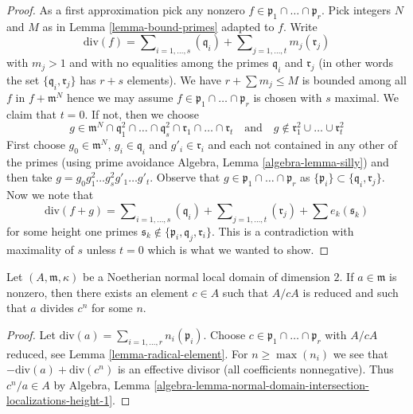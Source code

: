 \begin{proof}
As a first approximation pick any nonzero
$f \in \mathfrak p_1 \cap \ldots \cap \mathfrak p_r$.
Pick integers $N$ and $M$ as in Lemma \ref{lemma-bound-primes}
adapted to $f$. Write
$$
\text{div}(f) =
\sum\nolimits_{i = 1, \ldots, s} (\mathfrak q_i) +
\sum\nolimits_{j = 1, \ldots, t} m_j (\mathfrak r_j)
$$
with $m_j > 1$ and with no equalities among the primes
$\mathfrak q_i$ and $\mathfrak r_j$ (in other words the set
$\{\mathfrak q_i, \mathfrak r_j\}$ has $r + s$ elements).
We have $r + \sum m_j \leq M$ is bounded among all $f$ in
$f + \mathfrak m^N$ hence we may assume
$f \in \mathfrak p_1 \cap \ldots \cap \mathfrak p_r$ is chosen with $s$
maximal. We claim that $t = 0$. If not, then we choose
$$
g \in
\mathfrak m^N \cap
\mathfrak q_1^2 \cap \ldots \cap \mathfrak q_s^2 \cap
\mathfrak r_1 \cap \ldots \cap \mathfrak r_t
\quad\text{and}\quad
g \not \in \mathfrak r_1^2 \cup \ldots \cup \mathfrak r_t^2
$$
First choose $g_0 \in \mathfrak m^N$,
$g_i \in \mathfrak q_i$ and $g'_i \in \mathfrak r_i$
and each not contained in any other of the primes
(using prime avoidance Algebra, Lemma \ref{algebra-lemma-silly})
and then take $g = g_0 g_1^2 \ldots g_s^2 g'_1 \ldots g'_t$.
Observe that $g \in \mathfrak p_1 \cap \ldots \cap \mathfrak p_r$
as $\{\mathfrak p_i\} \subset \{\mathfrak q_i, \mathfrak r_j\}$.
Now we note that
$$
\text{div}(f + g) = \sum\nolimits_{i = 1, \ldots, s} (\mathfrak q_i) +
\sum\nolimits_{j = 1, \ldots, t} (\mathfrak r_j) +
\sum e_k (\mathfrak s_k)
$$
for some height one primes
$\mathfrak s_k \not \in \{\mathfrak p_i, \mathfrak q_j, \mathfrak r_i\}$.
This is a contradiction with maximality of $s$ unless $t = 0$
which is what we wanted to show.
\end{proof}

\begin{lemma}
\label{lemma-divides-radical}
Let $(A, \mathfrak m, \kappa)$ be a Noetherian normal local domain
of dimension $2$. If $a \in \mathfrak m$ is nonzero, then there exists an
element $c \in A$ such that $A/cA$ is reduced and such that $a$ divides
$c^n$ for some $n$.
\end{lemma}

\begin{proof}
Let $\text{div}(a) = \sum_{i = 1, \ldots, r} n_i(\mathfrak p_i)$. Choose
$c \in \mathfrak p_1 \cap \ldots \cap \mathfrak p_r$ with $A/cA$
reduced, see Lemma \ref{lemma-radical-element}. For $n \geq \max(n_i)$
we see that $-\text{div}(a) + \text{div}(c^n)$
is an effective divisor (all coefficients
nonnegative). Thus $c^n/a \in A$ by Algebra, Lemma
\ref{algebra-lemma-normal-domain-intersection-localizations-height-1}.
\end{proof}

